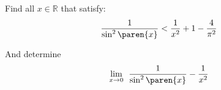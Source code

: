 Find all $x \in \mathbb{R}$ that satisfy:
\begin{equation*}
  \frac{1}{\sin^2\paren{x}}
  < \frac{1}{x^2} + 1 - \frac{4}{\pi^2}
\end{equation*}

And determine
\begin{equation*}
  \lim\limits_{x \to 0} {\mspace{8mu} \frac{1}{\sin^2\paren{x}} - \frac{1}{x^2}}
\end{equation*}
